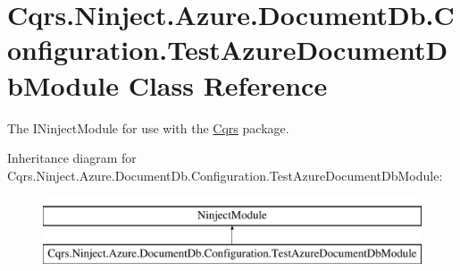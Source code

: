 \hypertarget{classCqrs_1_1Ninject_1_1Azure_1_1DocumentDb_1_1Configuration_1_1TestAzureDocumentDbModule}{}\section{Cqrs.\+Ninject.\+Azure.\+Document\+Db.\+Configuration.\+Test\+Azure\+Document\+Db\+Module Class Reference}
\label{classCqrs_1_1Ninject_1_1Azure_1_1DocumentDb_1_1Configuration_1_1TestAzureDocumentDbModule}


The I\+Ninject\+Module for use with the \hyperlink{namespaceCqrs}{Cqrs} package.  


Inheritance diagram for Cqrs.\+Ninject.\+Azure.\+Document\+Db.\+Configuration.\+Test\+Azure\+Document\+Db\+Module\+:\begin{figure}[H]
\begin{center}
\leavevmode
\includegraphics[height=2.000000cm]{classCqrs_1_1Ninject_1_1Azure_1_1DocumentDb_1_1Configuration_1_1TestAzureDocumentDbModule}
\end{center}
\end{figure}
